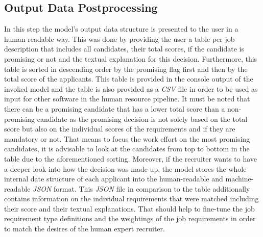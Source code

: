 \documentclass[draft,final]{thesisclass} %
\begin{document}
\subsection{Output Data Postprocessing}
In this step the model's output data structure is presented to the user in a human-readable way.
This was done by providing the user a table per job description that includes all candidates, their total scores, if the candidate is promising or not and the textual explanation for this decision.
Furthermore, this table is sorted in descending order by the promising flag first and then by the total score of the applicants.
This table is provided in the console output of the invoked model and the table is also provided as a \textit{CSV} file in order to be used as input for other software in the human resource pipeline.
It must be noted that there can be a promising candidate that has a lower total score than a non-promising candidate as the promising decision is not solely based on the total score but also on the individual scores of the requirements and if they are mandatory or not.
That means to focus the work effort on the most promising candidates, it is advisable to look at the candidates from top to bottom in the table due to the aforementioned sorting.
Moreover, if the recruiter wants to have a deeper look into how the decision was made up, the model stores the whole internal date structure of each applicant into the human-readable and machine-readable \textit{JSON} format.
This \textit{JSON} file in comparison to the table additionally contains information on the individual requirements that were matched including their score and their textual explanations.
That should help to fine-tune the job requirement type definitions and the weightings of the job requirements in order to match the desires of the human expert recruiter. 
\end{document}
